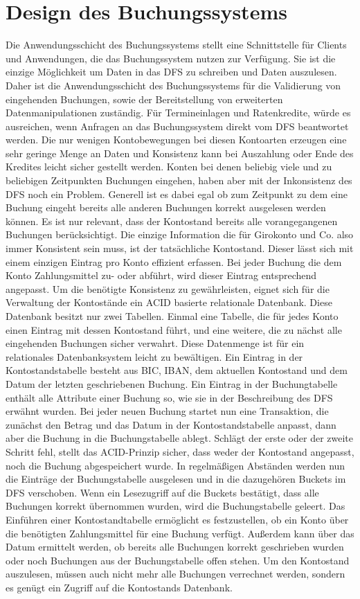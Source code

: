 \documentclass[12pt,oneside,a4paper,parskip]{scrbook}
\begin{document}
\section{Design des Buchungssystems}
Die Anwendungsschicht des Buchungssystems stellt eine Schnittstelle für Clients und Anwendungen, die das Buchungssystem nutzen zur Verfügung. Sie ist die einzige Möglichkeit um Daten in das DFS zu schreiben und Daten auszulesen. Daher ist die Anwendungsschicht des Buchungssystems für die Validierung von eingehenden Buchungen, sowie der Bereitstellung von erweiterten Datenmanipulationen zuständig. Für Termineinlagen und Ratenkredite, würde es ausreichen, wenn Anfragen an das Buchungssystem direkt vom DFS beantwortet werden. Die nur wenigen Kontobewegungen bei diesen Kontoarten erzeugen eine sehr geringe Menge an Daten und Konsistenz kann bei Auszahlung oder Ende des Kredites leicht sicher gestellt werden. Konten bei denen beliebig viele und zu beliebigen Zeitpunkten Buchungen eingehen, haben aber mit der Inkonsistenz des DFS noch ein Problem. Generell ist es dabei egal ob zum Zeitpunkt zu dem eine Buchung eingeht bereits alle anderen Buchungen korrekt ausgelesen werden können. Es ist nur relevant, dass der Kontostand bereits alle vorangegangenen Buchungen berücksichtigt. Die einzige Information die für Girokonto und Co. also immer Konsistent sein muss, ist der tatsächliche Kontostand. Dieser lässt sich mit einem einzigen Eintrag pro Konto effizient erfassen. Bei jeder Buchung die dem Konto Zahlungsmittel zu- oder abführt, wird dieser Eintrag entsprechend angepasst. Um die benötigte Konsistenz zu gewährleisten, eignet sich für die Verwaltung der Kontostände ein ACID basierte relationale Datenbank. Diese Datenbank besitzt nur zwei Tabellen. Einmal eine Tabelle, die für jedes Konto einen Eintrag mit dessen Kontostand führt, und eine weitere, die zu nächst alle eingehenden Buchungen sicher verwahrt. Diese Datenmenge ist für ein relationales Datenbanksystem leicht zu bewältigen. Ein Eintrag in der Kontostandstabelle besteht aus BIC, IBAN, dem aktuellen Kontostand und dem Datum der letzten geschriebenen Buchung. Ein Eintrag in der Buchungtabelle enthält alle Attribute einer Buchung so, wie sie in der Beschreibung des DFS erwähnt wurden. Bei jeder neuen Buchung startet nun eine Transaktion, die zunächst den Betrag und das Datum in der Kontostandstabelle anpasst, dann aber die Buchung in die Buchungstabelle ablegt. Schlägt der erste oder der zweite Schritt fehl, stellt das ACID-Prinzip sicher, dass weder der Kontostand angepasst, noch die Buchung abgespeichert wurde. In regelmäßigen Abständen werden nun die Einträge der Buchungstabelle ausgelesen und in die dazugehören Buckets im DFS verschoben. Wenn ein Lesezugriff auf die Buckets bestätigt, dass alle Buchungen korrekt übernommen wurden, wird die Buchungstabelle geleert. Das Einführen einer Kontostandtabelle ermöglicht es festzustellen, ob ein Konto über die benötigten Zahlungsmittel für eine Buchung verfügt. Außerdem kann über das Datum ermittelt werden, ob bereits alle Buchungen korrekt geschrieben wurden oder noch Buchungen aus der Buchungstabelle offen stehen. Um den Kontostand auszulesen, müssen auch nicht mehr alle Buchungen verrechnet werden, sondern es genügt ein Zugriff auf die Kontostands Datenbank.
\end{document}
